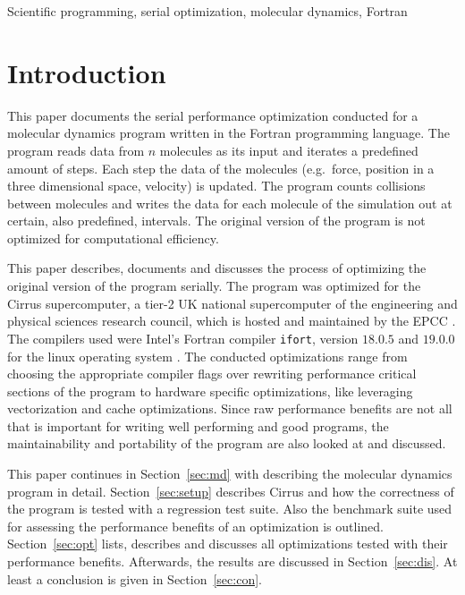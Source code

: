 \documentclass[twoside,11pt]{article}
\title{\titl}
\author{}
\begin{document}
\maketitle

\begin{abstract}
\end{abstract}

\begin{keywords}
Scientific programming, serial optimization, molecular dynamics,
Fortran
\end{keywords}

\section{Introduction} %
\label{sec:intro}

This paper documents the serial performance optimization conducted for
a molecular dynamics program written in the Fortran programming
language.
The program reads data from $n$ molecules as its input and iterates
a predefined amount of steps.
Each step the data of the molecules (e.g.\ force, position in a three
dimensional space, velocity) is updated.
The program counts collisions between molecules and writes the
data for each molecule of the simulation out at certain, also
predefined, intervals.
The original version of the program is not optimized for computational
efficiency.

This paper describes, documents and discusses the process of
optimizing the original version of the program serially.
The program was optimized for the Cirrus supercomputer, a tier-2
UK national supercomputer of the engineering and physical sciences
research council, which is hosted and maintained by the EPCC
\citep{cirrus}.
The compilers used were Intel's Fortran compiler \texttt{ifort},
version $18.0.5$ and $19.0.0$ for the linux operating system
\citep{ifort18, ifort19}.
The conducted optimizations range from choosing the appropriate
compiler flags over rewriting performance critical sections of the
program to hardware specific optimizations, like leveraging
vectorization and cache optimizations.
Since raw performance benefits are not all that is important for
writing well performing and good programs, the maintainability and
portability of the program are also looked at and discussed.


This paper continues in Section~\ref{sec:md} with describing the
molecular dynamics program in detail.
Section~\ref{sec:setup} describes Cirrus and how the correctness of
the program is tested with a regression test suite.
Also the benchmark suite used for assessing the performance benefits
of an optimization is outlined.
Section~\ref{sec:opt} lists, describes and discusses all
optimizations tested with their performance benefits.
Afterwards, the results are discussed in Section~\ref{sec:dis}.
At least a conclusion is given in Section~\ref{sec:con}.
\end{document}
